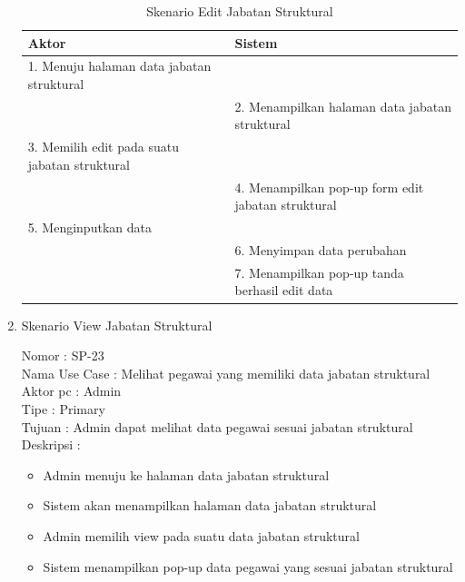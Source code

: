 \begin{enumerate}
\begin{itemize}
\end{itemize}

\begin{table}
	\caption{Skenario Edit Jabatan Struktural}
	\centering
	\begin{tabular}{ |p{75mm} | p{53mm} |}
		\hline 
		\textbf{Aktor} & \textbf{Sistem} \\
		\hline
		
		1.	Menuju halaman data jabatan struktural &  \\
		
		\hline
		
		&  2.	Menampilkan halaman data jabatan struktural \\
		
		\hline
		
		3. Memilih edit pada suatu jabatan struktural & \\
		
		\hline
		
		& 4.	Menampilkan pop-up form edit jabatan struktural\\
		
		\hline
		
		5.	Menginputkan data  & \\
		\hline
		
		& 6.	Menyimpan data perubahan \\
		\hline
		
		& 7.	Menampilkan pop-up tanda berhasil edit data \\
		\hline
		
	\end{tabular}
\end{table}

\item Skenario View Jabatan Struktural

Nomor \kern 3.6pc : SP-23\\
Nama Use Case : Melihat pegawai yang memiliki data jabatan struktural \\
Aktor  pc : Admin \\
Tipe \kern 4.6pc : Primary \\
Tujuan \kern 3.6pc : Admin dapat melihat data pegawai sesuai jabatan struktural\\
Deskripsi \kern 2.5pc : 

\begin{itemize}
	\item Admin menuju ke halaman data jabatan struktural
	\item Sistem akan menampilkan halaman data jabatan struktural
	\item Admin memilih view pada suatu data jabatan struktural
	\item Sistem menampilkan pop-up data pegawai yang sesuai jabatan struktural
	

\end{itemize}
\end{enumerate}
